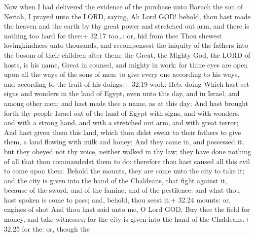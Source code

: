  Now when I had delivered the evidence of the purchase
unto Baruch the son of Neriah, I prayed unto the LORD, saying,
 Ah Lord GOD! behold, thou hast made the heaven and the
earth by thy great power and stretched out arm, and there is nothing too
hard for thee:+ 32.17 too\ldots: or, hid from thee  Thou
shewest lovingkindness unto thousands, and recompensest the iniquity of
the fathers into the bosom of their children after them: the Great, the
Mighty God, the LORD of hosts, is his name,  Great in
counsel, and mighty in work: for thine eyes are open upon all the ways
of the sons of men: to give every one according to his ways, and
according to the fruit of his doings:+ 32.19 work: Heb. doing
 Which hast set signs and wonders in the land of Egypt,
even unto this day, and in Israel, and among other men; and hast made
thee a name, as at this day;  And hast brought forth thy
people Israel out of the land of Egypt with signs, and with wonders, and
with a strong hand, and with a stretched out arm, and with great terror;
 And hast given them this land, which thou didst swear to
their fathers to give them, a land flowing with milk and honey;
 And they came in, and possessed it; but they obeyed not
thy voice, neither walked in thy law; they have done nothing of all that
thou commandedst them to do: therefore thou hast caused all this evil to
come upon them:  Behold the mounts, they are come unto the
city to take it; and the city is given into the hand of the Chaldeans,
that fight against it, because of the sword, and of the famine, and of
the pestilence: and what thou hast spoken is come to pass; and, behold,
thou seest it.+ 32.24 mounts: or, engines of shot  And thou
hast said unto me, O Lord GOD, Buy thee the field for money, and take
witnesses; for the city is given into the hand of the Chaldeans.+ 32.25
for the: or, though the

